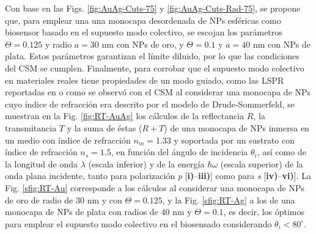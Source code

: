 Con base en las Figs. \ref{fig:AuAg-Cuts-75} y \ref{fig:AuAg-Cuts-Rad-75}, se propone que, para emplear una una monocapa desordenada de NPs esféricas como biosensor basado en el supuesto modo colectivo, se escojan los parámetros $\Theta=0.125$ y radio $a=30$ nm con NPs de oro, y $\Theta=0.1$ y $a=40$ nm con NPs de plata. Estos parámetros garantizan el límite diluido, por lo que las condiciones del CSM se cumplen. Finalmente, para corrobar que el supuesto modo colectivo en materiales reales tiene propiedades de un modo guiado, como las LSPR reportadas en \cite{kabashin2009plasmonic} o como se observó con el CSM al considerar una monocapa de NPs cuyo índice de refracción era descrito por el modelo de Drude-Sommerfeld, se  muestran en la Fig. \ref{fig:RT-AuAg}  los cálculos de la reflectancia $R$, la transmitancia $T$ y la suma de éstas ($R+T$) de una monocapa de NPs inmersa en un medio con índice de refracción $n_m=1.33$ y soportada por un sustrato con índice de refracción $n_s=1.5$, en función del ángulo de incidencia $\theta_i$, así como de la longitud de onda $\lambda$ (escala inferior) y de la energía  $\hbar\omega$ (escala superior) de la onda plana incidente, tanto para polarización \emph{p}  [\textbf{i)}--\textbf{iii)}] como para \emph{s} [\textbf{iv)}--\textbf{vi)}]. La Fig. \ref{sfig:RT-Au} corresponde a los cálculos al considerar una monocapa de NPs de oro de radio de $30$ nm y con $\Theta=0.125$, y la  Fig. \ref{sfig:RT-Ag} a los de una monocapa de NPs de plata con radios de $40$ nm y $\Theta=0.1$, es decir, los óptimos para emplear el supuesto modo colectivo en el biosensado considerando $\theta_i<80^\circ$.
